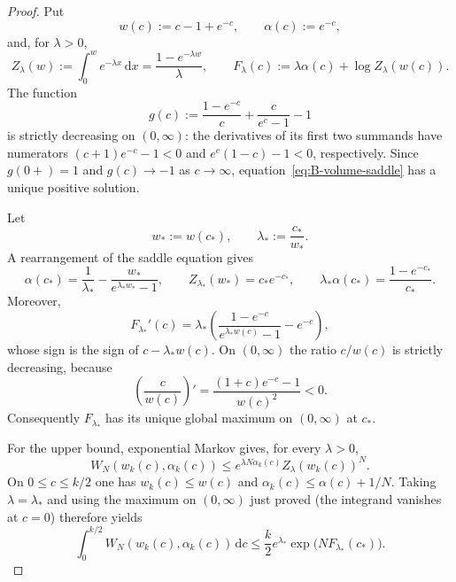 \documentclass[11pt]{article}
\theoremstyle{definition}
\theoremstyle{remark}
\begin{document}
\begin{proof}
Put
\[
 w(c):=c-1+e^{-c},\qquad \alpha(c):=e^{-c},
\]
and, for $\lambda>0$,
\[
 Z_\lambda(w):=\int_0^w e^{-\lambda x}\,\mathrm d x
 =\frac{1-e^{-\lambda w}}{\lambda},\qquad
 F_\lambda(c):=\lambda\alpha(c)+\log Z_\lambda(w(c)).
\]
The function
\[
 g(c):=\frac{1-e^{-c}}c+\frac c{e^c-1}-1
\]
is strictly decreasing on $(0,\infty)$: the derivatives of its first two
summands have numerators $(c+1)e^{-c}-1<0$ and
$e^c(1-c)-1<0$, respectively.  Since $g(0+)=1$ and
$g(c)\to-1$ as $c\to\infty$, equation~\eqref{eq:B-volume-saddle} has a
unique positive solution.

Let
\[
 w_*:=w(c_*),\qquad \lambda_*:=\frac{c_*}{w_*}.
\]
A rearrangement of the saddle equation gives
\begin{equation}\label{eq:B-volume-saddle-identities}
 \alpha(c_*)=
 \frac1{\lambda_*}-\frac{w_*}{e^{\lambda_*w_*}-1},\qquad
 Z_{\lambda_*}(w_*)=c_*e^{-c_*},\qquad
 \lambda_*\alpha(c_*)=\frac{1-e^{-c_*}}{c_*}.
\end{equation}
Moreover,
\[
 F_{\lambda_*}'(c)
 =\lambda_*\left(
   \frac{1-e^{-c}}{e^{\lambda_*w(c)}-1}-e^{-c}\right),
\]
whose sign is the sign of $c-\lambda_*w(c)$.  On $(0,\infty)$ the ratio
$c/w(c)$ is strictly decreasing, because
\[
 \left(\frac c{w(c)}\right)'
 =\frac{(1+c)e^{-c}-1}{w(c)^2}<0.
\]
Consequently $F_{\lambda_*}$ has its unique global maximum on
$(0,\infty)$ at $c_*$.

For the upper bound, exponential Markov gives, for every $\lambda>0$,
\[
 W_N(w_k(c),\alpha_k(c))
 \le e^{\lambda N\alpha_k(c)}Z_\lambda(w_k(c))^N.
\]
On $0\le c\le k/2$ one has $w_k(c)\le w(c)$ and
$\alpha_k(c)\le\alpha(c)+1/N$.  Taking $\lambda=\lambda_*$ and using the
maximum on $(0,\infty)$ just proved (the integrand vanishes at $c=0$)
therefore yields
\[
 \int_0^{k/2}W_N(w_k(c),\alpha_k(c))\,\mathrm d c
 \le \frac{k}{2}e^{\lambda_*}
     \exp\bigl(NF_{\lambda_*}(c_*)\bigr).
\]


\end{proof}
\end{document}
